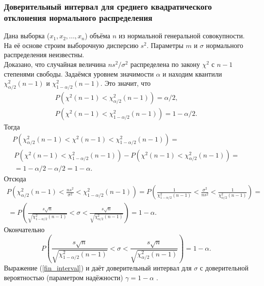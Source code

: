 \documentclass[../body.tex]{subfiles}
\begin{document}
	\subsubsection{Доверительный интервал для среднего квадратического отклонения нормального распределения}
	Дана выборка ($x_{1},x_{2}, ... ,x_{n}$) объёма $n$ из нормальной генеральной совокупности. На её основе строим выборочную дисперсию $s^{2}$. Параметры $m$ и $\sigma$ нормального распределения неизвестны.\\ Доказано, что случайная величина $ns^{2}/\sigma^{2}$ распределена по закону $\chi^{2}$ с $n-1$ степенями свободы.
	\newline
	Задаёмся уровнем значимости $\alpha$ и находим квантили $\chi^{2}_{\alpha/2}(n-1)$ и $\chi^{2}_{1-\alpha/2}(n-1)$.
	\newline
	Это значит, что 
	\begin{equation}
		\begin{split}
			P\left(\chi^{2}(n-1) < \chi^{2}_{\alpha/2}(n-1)\right) = \alpha/2, \\
			P\left(\chi^{2}(n-1) < \chi^{2}_{1-\alpha/2}(n-1)\right) = 1-\alpha/2.
			\label{P_chi_2x2} 
		\end{split}
	\end{equation}
	Тогда
	\begin{multline}
		P\left(\chi^{2}_{\alpha/2}(n-1) < \chi^{2}(n-1) < \chi^{2}_{1-\alpha/2}(n-1)\right) = \\\
		P\left(\chi^{2}(n-1) < \chi^{2}_{1-\alpha/2}(n-1)\right) -P\left(\chi^{2}(n-1) < \chi^{2}_{\alpha/2}(n-1)\right) = \\\ = 1 - \alpha/2 -\alpha/2 = 1 - \alpha.
		\label{P_chi_2}
	\end{multline}
	Отсюда
	\begin{multline}
		P\left(\chi^{2}_{\alpha/2}(n-1) < \frac{ns^{2}}{\sigma^{2}} < \chi^{2}_{1-\alpha/2}(n-1)\right) =
		P\left(\frac{1}{\chi^{2}_{1-\alpha/2}(n-1)} < \frac{\sigma^{2}}{ns^{2}} < \frac{1}{\chi^{2}_{\alpha/2}(n-1)} \right) = \\\ =
		P\left(\frac{s\sqrt{n}}{\sqrt{\chi^{2}_{1-\alpha/2}(n-1)}} < \sigma <  \frac{s\sqrt{n}}{\sqrt{\chi^{2}_{\alpha/2}(n-1)}}\right) = 1- \alpha.
		\label{interv}
	\end{multline}
	Окончательно
	\begin{equation}
		P\left(\frac{s\sqrt{n}}{\sqrt{\chi^{2}_{1-\alpha/2}(n-1)}} < \sigma <  \frac{s\sqrt{n}}{\sqrt{\chi^{2}_{\alpha/2}(n-1)}}\right) = 1- \alpha.
		\label{fin_interval}
	\end{equation}
	Выражение (\ref{fin_interval}) и даёт доверительный интервал для $\sigma$ с доверительной вероятностью (параметром надёжности) $\gamma = 1 - \alpha$ \cite[c.~458-459]{max}.
	
\end{document}

